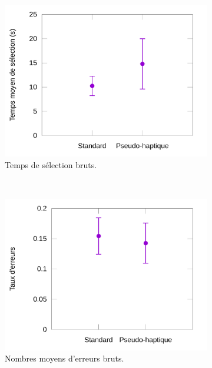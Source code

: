 	\begin{figure}[!htb]
		\begin{subfigure}[t]{0.49\textwidth}
			\centering
			\includegraphics[width=\textwidth]{figures/ch5/phSpRawTimes}
			\caption{Temps de sélection bruts.}
			\label{fig:phSpRawTimes}
		\end{subfigure}
		~
		\begin{subfigure}[t]{0.49\textwidth}
			\centering
			\includegraphics[width=\textwidth]{figures/ch5/phSpRawErrors}
			\caption{Nombres moyens d'erreurs bruts.}
			\label{fig:phSpRawErrors}
		\end{subfigure}
		~
		\begin{subfigure}[t]{0.49\textwidth}
			\centering

\end{subfigure}
\end{figure}
